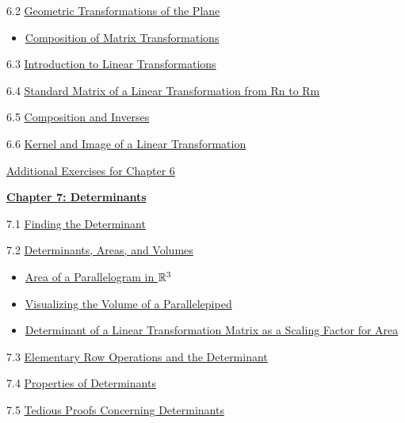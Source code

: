 \documentclass{ximera}
\begin{document}
6.2	\href{https://ximera.osu.edu/oerlinalg/LinearAlgebra/LTR-0070/main}{Geometric Transformations of the Plane}
\begin{itemize}
    \item 
    \href{https://www.geogebra.org/m/d6jyt85s}{Composition of Matrix Transformations}
\end{itemize}
	
6.3	\href{https://ximera.osu.edu/oerlinalg/LinearAlgebra/LTR-0010/main}{Introduction to Linear Transformations}
	
6.4	\href{https://ximera.osu.edu/oerlinalg/LinearAlgebra/LTR-0020/main}{Standard Matrix of a Linear Transformation from Rn to Rm}
	
6.5	\href{https://ximera.osu.edu/oerlinalg/LinearAlgebra/LTR-0030/main}{Composition and Inverses}
	
6.6	\href{https://ximera.osu.edu/oerlinalg/LinearAlgebra/LTR-0050/main}{Kernel and Image of a Linear Transformation}
	
\href{https://ximera.osu.edu/oerlinalg/LinearAlgebra/SUPX-0060/main}{Additional Exercises for Chapter 6}
	
\href{https://ximera.osu.edu/oerlinalg/LinearAlgebra/XLAChapter_det/main}{\textbf{Chapter 7: Determinants}}
	
7.1	\href{https://ximera.osu.edu/oerlinalg/LinearAlgebra/DET-0010/main}{Finding the Determinant}
	
7.2	\href{https://ximera.osu.edu/oerlinalg/LinearAlgebra/DET-0070/main}{Determinants, Areas, and Volumes}
\begin{itemize}
    \item 
    \href{https://www.geogebra.org/m/g7g6kjqm}{Area of a Parallelogram in $\mathbb{R}^3$}
    \item 
    \href{https://www.geogebra.org/classic/tfuzeqwr}{Visualizing the Volume of a Parallelepiped}
    \item
    \href{https://www.geogebra.org/m/nr8jsz4w}{Determinant of a Linear Transformation Matrix as a Scaling Factor for Area}
\end{itemize}
	
7.3	\href{https://ximera.osu.edu/oerlinalg/LinearAlgebra/DET-0030/main}{Elementary Row Operations and the Determinant}
	
7.4	\href{https://ximera.osu.edu/oerlinalg/LinearAlgebra/DET-0040/main}{Properties of Determinants}
	
7.5	\href{https://ximera.osu.edu/oerlinalg/LinearAlgebra/DET-0050/main}{Tedious Proofs Concerning Determinants}
	
\end{document}
